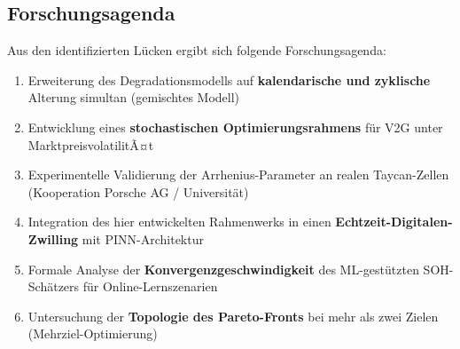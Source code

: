﻿\documentclass[a4paper,12pt]{article}
\theoremstyle{definition}
\begin{document}
\subsection{Forschungsagenda}

Aus den identifizierten L\"ucken ergibt sich folgende Forschungsagenda:
\begin{enumerate}
  \item Erweiterung des Degradationsmodells auf \textbf{kalendarische
    und zyklische} Alterung simultan (gemischtes Modell)
  \item Entwicklung eines \textbf{stochastischen Optimierungsrahmens}
    f\"ur V2G unter MarktpreisvolatilitÃ¤t
  \item Experimentelle Validierung der Arrhenius-Parameter an
    realen Taycan-Zellen (Kooperation Porsche AG / Universit\"at)
  \item Integration des hier entwickelten Rahmenwerks in einen
    \textbf{Echtzeit-Digitalen-Zwilling} mit PINN-Architektur
  \item Formale Analyse der \textbf{Konvergenzgeschwindigkeit} des
    ML-gest\"utzten SOH-Sch\"atzers f\"ur Online-Lernszenarien
  \item Untersuchung der \textbf{Topologie des Pareto-Fronts}
    bei mehr als zwei Zielen (Mehrziel-Optimierung)
\end{enumerate}
\end{document}
